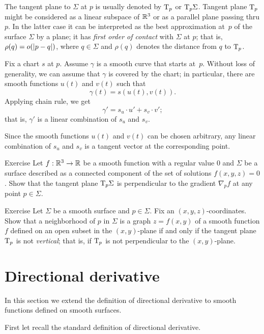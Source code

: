 The tangent plane to $\Sigma$ at $p$ is usually denoted by $\mathrm{T}_p$ or $\mathrm{T}_p\Sigma$.
Tangent plane $\mathrm{T}_p$ might be considered as a linear subspace of $\mathbb{R}^3$ or as a parallel plane passing thru $p$.
In the latter case it can be interpreted as the best approximation at~$p$ of the surface $\Sigma$ by a plane;
it has \emph{first order of contact} with $\Sigma$ at $p$;
that is, $\rho(q)\z=o(|p-q|)$, where $q\in \Sigma$ and $\rho(q)$ denotes the distance from $q$ to $\mathrm{T}_p$.

Fix a chart $s$ at $p$.
Assume $\gamma$ is a smooth curve that starts at~$p$.
Without loss of generality, we can assume that $\gamma$ is covered by the chart;
in particular, there are smooth functions $u(t)$ and $v(t)$ such that 
\[\gamma(t)=s(u(t),v(t)).\]
Applying chain rule, we get
\[\gamma'=s_u\cdot u'+ s_v\cdot v';\]
that is, $\gamma'$ is a linear combination of $s_u$ and $s_v$.

Since the smooth functions $u(t)$ and $v(t)$ can be chosen arbitrary, any linear combination of $s_u$ and $s_v$ is a tangent vector at the corresponding point. 
\qeds


\begin{thm}{Exercise}\label{ex:tangent-normal}
Let $f:\mathbb{R}^3\to\mathbb{R}$ be a smooth function with a regular value $0$ and $\Sigma$ be a surface described as a connected component of the set of solutions $f(x,y,z)=0$.
Show that the tangent plane $\mathrm{T}_p\Sigma$ is perpendicular to the gradient $\nabla_pf$ at any point $p\in\Sigma$.
\end{thm}

\begin{thm}{Exercise}\label{ex:vertical-tangent}
Let $\Sigma$ be a smooth surface and $p\in\Sigma$.
Fix an $(x,y,z)$-coordinates.
Show that a neighborhood of $p$ in $\Sigma$ is a graph $z=f(x,y)$ of a smooth function $f$ defined on an open subset in the $(x,y)$-plane if and only if the tangent plane $\mathrm{T}_p$ is not {}\emph{vertical}; that is, if $\mathrm{T}_p$ is not perpendicular to the $(x,y)$-plane.
\end{thm}


\section{Directional derivative}

In this section we extend the definition of directional derivative to smooth functions defined on smooth surfaces.

First let recall the standard definition of directional derivative.

